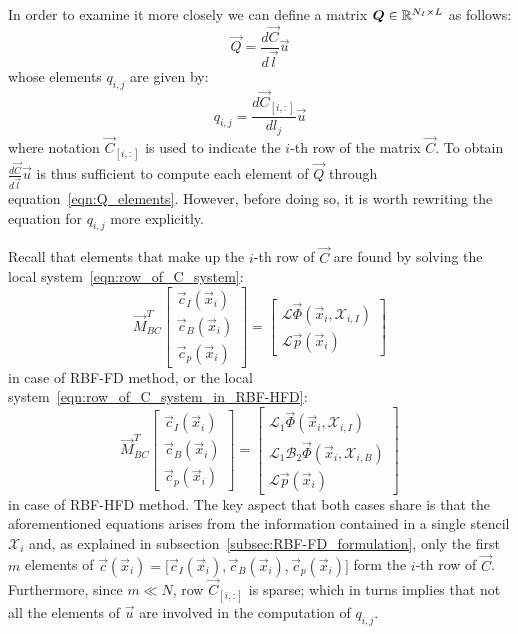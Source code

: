 \medskip
In order to examine it more closely we can define a matrix $\boldsymbol{Q} \in \mathbb{R}^{N_I \times L}$ as follows:
\begin{equation}
	\vec{Q} = \frac{d\vec{C}}{d\vec{l}} \vec{u}
\end{equation}
whose elements $q_{i,j}$ are given by:
\begin{equation}
	\label{eqn:Q_elements}
	q_{i,j} = \frac{d\vec{C}_{[i,:]}}{dl_j} \vec{u}
\end{equation}
where notation $\vec{C}_{[i,:]}$ is used to indicate the $i$-th row of the matrix $\vec{C}$.
To obtain $\frac{d\vec{C}}{d\vec{l}} \vec{u}$ is thus sufficient to compute each element of $\vec{Q}$ through equation~\eqref{eqn:Q_elements}. However, before doing so, it is worth rewriting the equation for $q_{i,j}$ more explicitly.

Recall that elements that make up the $i$-th row of $\vec{C}$ are found by solving the local system~\eqref{eqn:row_of_C_system}:
\begin{equation}
	\vec{M}_{BC}^T
	\begin{bmatrix}
		\vec{c}_I(\vec{x}_i)  \\
		\vec{c}_B(\vec{x}_i)  \\
		\vec{c}_p(\vec{x}_i)
	\end{bmatrix} = 
	\begin{bmatrix}
		\mathcal{L} \vec{\Phi}(\vec{x}_i, \mathcal{X}_{i,I})  \\
		\mathcal{L} \vec{p}(\vec{x}_i)
	\end{bmatrix}
\end{equation}
in case of RBF-FD method, or the local system~\eqref{eqn:row_of_C_system_in_RBF-HFD}:
\begin{equation}
	\label{eqn:adjoint_method_row_of_C_system_in_RBF-HFD}
	\vec{M}_{BC}^T
	\begin{bmatrix}
		\vec{c}_I(\vec{x}_i)  \\
		\vec{c}_B(\vec{x}_i)  \\
		\vec{c}_p(\vec{x}_i)
	\end{bmatrix} = 
	\begin{bmatrix}
		\mathcal{L}_1 \vec{\Phi}(\vec{x}_i, \mathcal{X}_{i,I})  			  \\
		\mathcal{L}_1 \mathcal{B}_2 \vec{\Phi}(\vec{x}_i, \mathcal{X}_{i,B})  \\
		\mathcal{L} \vec{p}(\vec{x}_i)
	\end{bmatrix}
\end{equation}
in case of RBF-HFD method. The key aspect that both cases share is that the aforementioned equations arises from the information contained in a single stencil $\mathcal{X}_i$ and, as explained in subsection~\vref{subsec:RBF-FD_formulation}, only the first $m$ elements of $\vec{c}(\vec{x}_i) = \bigl[ \vec{c}_I(\vec{x}_i), \vec{c}_B(\vec{x}_i), \vec{c}_p(\vec{x}_i) \bigr]$ form the $i$-th row of $\vec{C}$. 
Furthermore, since $m \ll N$, row $\vec{C}_{[i,:]}$ is sparse; which in turns implies that not all the elements of $\vec{u}$ are involved in the computation of $q_{i,j}$.

